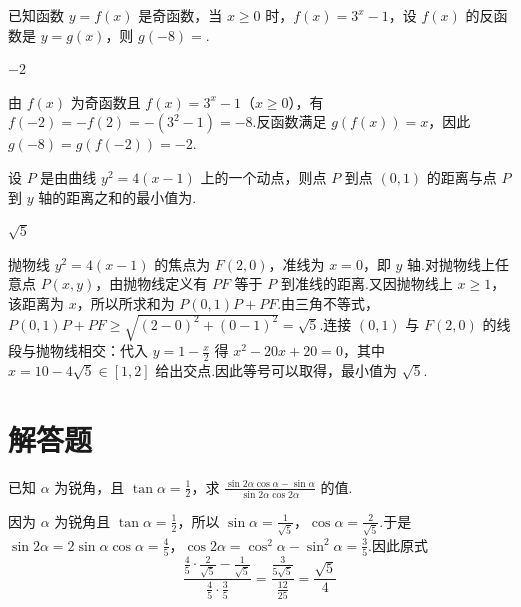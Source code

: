 \begin{problem}
已知函数 \(y = f(x)\) 是奇函数，当 \(x \geqslant 0\) 时，\(f(x) = 3^x - 1\)，设 \(f(x)\) 的反函数是 \(y = g(x)\)，则 \(g(-8) =\)\fillinblank{}.
\end{problem}

\begin{answer}\(-2\)\end{answer}

\begin{solution}
由 \(f(x)\) 为奇函数且 \(f(x)=3^x-1\)（\(x\geqslant0\)），有 \(f(-2)=-f(2)=-(3^2-1)=-8\).反函数满足 \(g(f(x))=x\)，因此 \(g(-8)=g(f(-2))=-2\).
\end{solution}

\begin{problem}
设 \(P\) 是由曲线 \(y^{2} = 4(x - 1)\) 上的一个动点，则点 \(P\) 到点 \((0,1)\) 的距离与点 \(P\) 到 \(y\) 轴的距离之和的最小值为\fillinblank{}.
\end{problem}

\begin{answer}\(\sqrt{5}\)\end{answer}

\begin{solution}
抛物线 \(y^2=4(x-1)\) 的焦点为 \(F(2,0)\)，准线为 \(x=0\)，即 \(y\) 轴.对抛物线上任意点 \(P(x,y)\)，由抛物线定义有 \(PF\) 等于 \(P\) 到准线的距离.又因抛物线上 \(x\geqslant1\)，该距离为 \(x\)，所以所求和为 \(P(0,1)P+PF\).由三角不等式，\(P(0,1)P+PF\geqslant\sqrt{(2-0)^2+(0-1)^2}=\sqrt5\).连接 \((0,1)\) 与 \(F(2,0)\) 的线段与抛物线相交：代入 \(y=1-\frac{x}{2}\) 得 \(x^2-20x+20=0\)，其中 \(x=10-4\sqrt5\in[1,2]\) 给出交点.因此等号可以取得，最小值为 \(\sqrt5\).
\end{solution}

\section{解答题}
\begin{problem}
已知 \(\alpha\) 为锐角，且 \(\tan \alpha = \frac{1}{2}\)，求 \(\frac{\sin 2\alpha \cos \alpha - \sin \alpha}{\sin 2\alpha \cos 2\alpha}\) 的值.
\end{problem}

\begin{solution}
因为 \(\alpha\) 为锐角且 \(\tan\alpha=\frac12\)，所以 \(\sin\alpha=\frac1{\sqrt5}\)，\(\cos\alpha=\frac2{\sqrt5}\).于是 \(\sin2\alpha=2\sin\alpha\cos\alpha=\frac45\)，\(\cos2\alpha=\cos^2\alpha-\sin^2\alpha=\frac35\).因此原式
\[
\frac{\frac45\cdot\frac2{\sqrt5}-\frac1{\sqrt5}}{\frac45\cdot\frac35}
=\frac{\frac3{5\sqrt5}}{\frac{12}{25}}
=\frac{\sqrt5}{4}
\]
\end{solution}

